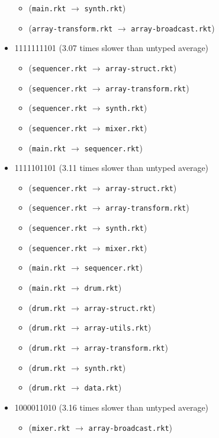 \documentclass{article}
\newcommand{\mono}[1]{\texttt{#1}}
\begin{document}
\begin{itemize}
\begin{itemize}
  \item (\mono{main.rkt} $\rightarrow$ \mono{synth.rkt})
  \item (\mono{array-transform.rkt} $\rightarrow$ \mono{array-broadcast.rkt})
  \end{itemize}
\item 1111111101 (3.07 times slower than untyped average)
  \begin{itemize}
  \item (\mono{sequencer.rkt} $\rightarrow$ \mono{array-struct.rkt})
  \item (\mono{sequencer.rkt} $\rightarrow$ \mono{array-transform.rkt})
  \item (\mono{sequencer.rkt} $\rightarrow$ \mono{synth.rkt})
  \item (\mono{sequencer.rkt} $\rightarrow$ \mono{mixer.rkt})
  \item (\mono{main.rkt} $\rightarrow$ \mono{sequencer.rkt})
  \end{itemize}
\item 1111101101 (3.11 times slower than untyped average)
  \begin{itemize}
  \item (\mono{sequencer.rkt} $\rightarrow$ \mono{array-struct.rkt})
  \item (\mono{sequencer.rkt} $\rightarrow$ \mono{array-transform.rkt})
  \item (\mono{sequencer.rkt} $\rightarrow$ \mono{synth.rkt})
  \item (\mono{sequencer.rkt} $\rightarrow$ \mono{mixer.rkt})
  \item (\mono{main.rkt} $\rightarrow$ \mono{sequencer.rkt})
  \item (\mono{main.rkt} $\rightarrow$ \mono{drum.rkt})
  \item (\mono{drum.rkt} $\rightarrow$ \mono{array-struct.rkt})
  \item (\mono{drum.rkt} $\rightarrow$ \mono{array-utils.rkt})
  \item (\mono{drum.rkt} $\rightarrow$ \mono{array-transform.rkt})
  \item (\mono{drum.rkt} $\rightarrow$ \mono{synth.rkt})
  \item (\mono{drum.rkt} $\rightarrow$ \mono{data.rkt})
  \end{itemize}
\item 1000011010 (3.16 times slower than untyped average)
  \begin{itemize}
  \item (\mono{mixer.rkt} $\rightarrow$ \mono{array-broadcast.rkt})

\end{itemize}
\end{itemize}
\end{document}
